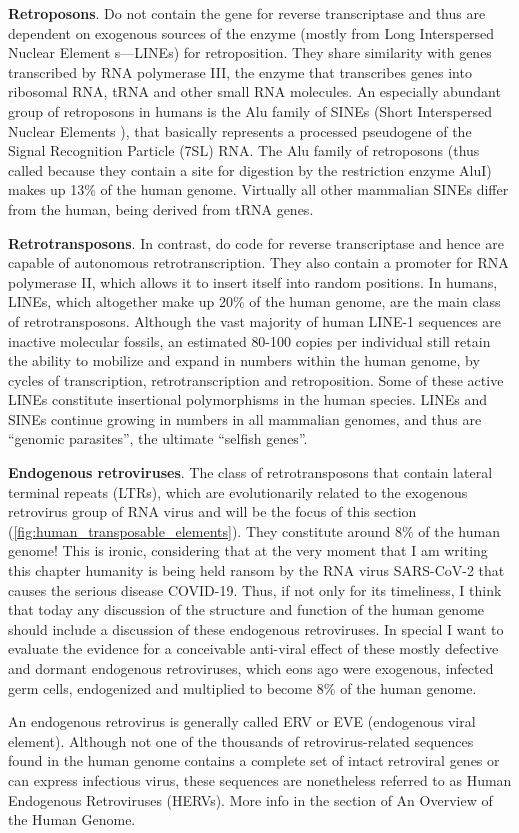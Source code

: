 \textbf{Retroposons}. Do not contain the gene for reverse transcriptase and thus are dependent on exogenous sources of 
the enzyme (mostly from Long Interspersed Nuclear Element s—LINEs) for retroposition. They share similarity with genes 
transcribed by RNA polymerase III, the enzyme that transcribes genes into ribosomal RNA, tRNA and other small RNA molecules. 
An especially abundant group of retroposons in humans is the Alu family of SINEs (Short Interspersed Nuclear Elements ), 
that basically represents a processed pseudogene of the Signal Recognition Particle (7SL) RNA. The Alu family of retroposons 
(thus called because they contain a site for digestion by the restriction enzyme AluI) makes up 13\% of the human genome. 
Virtually all other mammalian SINEs differ from the human, being derived from tRNA genes.  

\textbf{Retrotransposons}. In contrast, do code for reverse transcriptase and hence are capable of autonomous retrotranscription. 
They also contain a promoter for RNA polymerase II, which allows it to insert itself into random positions. In humans, LINEs, 
which altogether make up 20\% of the human genome, are the main class of retrotransposons. Although the vast majority of 
human LINE-1 sequences are inactive molecular fossils, an estimated 80-100 copies per individual still retain the ability 
to mobilize and expand in numbers within the human genome, by cycles of transcription, retrotranscription and retroposition. 
Some of these active LINEs constitute insertional polymorphisms in the human species. LINEs and SINEs continue growing in 
numbers in all mammalian genomes, and thus are “genomic parasites”, the ultimate “selfish genes”.  

\textbf{Endogenous retroviruses}. The class of retrotransposons that contain lateral terminal repeats (LTRs), which are evolutionarily 
related to the exogenous retrovirus group of RNA virus and will be the focus of this section (\autoref{fig:human_transposable_elements}). 
They constitute around 8\% of the human genome! This is ironic, considering that at the very moment that I am writing this 
chapter humanity is being held ransom by the RNA virus SARS-CoV-2 that causes the serious disease COVID-19. Thus, if not 
only for its timeliness, I think that today any discussion of the structure and function of the human genome should include 
a discussion of these endogenous retroviruses. In special I want to evaluate the evidence for a conceivable anti-viral effect 
of these mostly defective and dormant endogenous retroviruses, which eons ago were exogenous, infected germ cells, endogenized 
and multiplied to become 8\% of the human genome. 

An endogenous retrovirus is generally called ERV or EVE (endogenous viral element). Although not one of the thousands of 
retrovirus-related sequences found in the human genome contains a complete set of intact retroviral genes or can express 
infectious virus, these sequences are nonetheless referred to as Human Endogenous Retroviruses (HERVs). More info in the 
section of An Overview of the Human Genome.